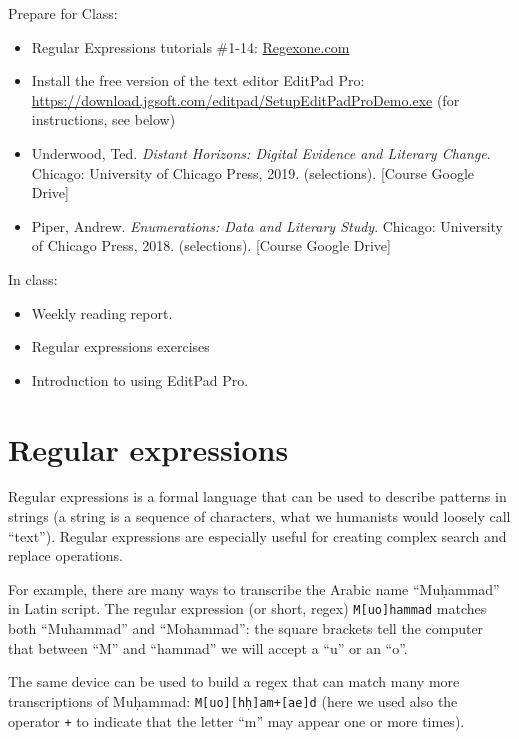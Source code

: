 \documentclass[
]{book}
\providecommand{\tightlist}{%
  \setlength{\itemsep}{0pt}\setlength{\parskip}{0pt}}
\begin{document}
Prepare for Class:

\begin{itemize}
\tightlist
\item
  Regular Expressions tutorials \#1-14: \href{https://Regexone.com}{Regexone.com}
\item
  Install the free version of the text editor EditPad Pro: \url{https://download.jgsoft.com/editpad/SetupEditPadProDemo.exe} (for instructions, see below)
\item
  Underwood, Ted. \emph{Distant Horizons: Digital Evidence and Literary Change}. Chicago: University of Chicago Press, 2019. (selections). {[}Course Google Drive{]}
\item
  Piper, Andrew. \emph{Enumerations: Data and Literary Study}. Chicago: University of Chicago Press, 2018. (selections). {[}Course Google Drive{]}
\end{itemize}

In class:

\begin{itemize}
\tightlist
\item
  Weekly reading report.
\item
  Regular expressions exercises
\item
  Introduction to using EditPad Pro.
\end{itemize}

\hypertarget{regular-expressions}{%
\section{Regular expressions}\label{regular-expressions}}

Regular expressions is a formal language that can be used to describe patterns in strings (a string is a sequence of characters, what we humanists would loosely call ``text''). Regular expressions are especially useful for creating complex search and replace operations.

For example, there are many ways to transcribe the Arabic name ``Muḥammad'' in Latin script. The regular expression (or short, regex) \texttt{M{[}uo{]}hammad} matches both ``Muhammad'' and ``Mohammad'': the square brackets tell the computer that between ``M'' and ``hammad'' we will accept a ``u'' or an ``o''.

The same device can be used to build a regex that can match many more transcriptions of Muḥammad: \texttt{M{[}uo{]}{[}hḥ{]}am+{[}ae{]}d} (here we used also the operator \texttt{+} to indicate that the letter ``m'' may appear one or more times).
\end{document}
